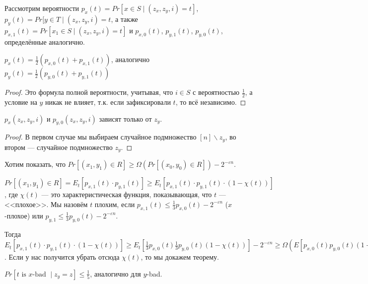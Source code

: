 Рассмотрим вероятности $p_x(t) = Pr[x \in S \mid (z_x, z_y, i) = t]$, $p_y(t) = Pr[y \in T \mid (z_x, z_y, i) = t$, а также $p_{x, 1}(t) = Pr[x_1 \in S \mid (z_x, z_y, i) = t]$ и $p_{x, 0}(t)$, $p_{y, 1}(t)$, $p_{y, 0}(t)$, определённые аналогично.

\begin{remark}
$p_x(t) = \frac{1}{2}(p_{x, 0}(t) + p_{x, 1}(t))$, аналогично $p_y(t) = \frac{1}{2}(p_{y, 0}(t) + p_{y, 1}(t))$
\end{remark}

\begin{proof}
Это формула полной вероятности, учитывая, что $i \in S$ с вероятностью $\frac{1}{2}$, а условие на $y$ никак не влияет, т.к. если зафиксировали $t$, то всё независимо.
\end{proof}

\begin{remark}
$p_x(z_x, z_y, i)$ и $p_{y, 0}(z_x, z_y, i)$ зависят только от $z_y$.
\end{remark}
\begin{proof}
В первом случае мы выбираем случайное подмножество $[n] \backslash z_y$, во втором --- случайное подмножество $z_y$.
\end{proof}

Хотим показать, что $Pr[(x_1, y_1) \in R] \geq \Omega(Pr[(x_0, y_0) \in R]) - 2^{-\varepsilon n}$.

$Pr[(x_1, y_1) \in R] = E_t[p_{x, 1}(t) \cdot p_{y, 1}(t)] \geq E_t[p_{x, 1}(t) \cdot p_{y, 1}(t) \cdot (1 - \chi(t))]$, где $\chi(t)$ --- это характеристическая функция, показывающая, что $t$ --- <<плохое>>. Мы назовём $t$ плохим, если $p_{x, 1}(t) \leq \frac{1}{3}p_{x, 0}(t) - 2^{-\varepsilon n}$ ($x$-плохое) или $p_{y, 1} \leq \frac{1}{3} p_{y, 0}(t) - 2^{-\varepsilon n}$.

Тогда $E_t[p_{x, 1}(t) \cdot p_{y, 1}(t) \cdot (1 - \chi(t))] \geq E_t[\frac{1}{3}p_{x, 0}(t)\frac{1}{3}p_{y, 0}(t)(1 - \chi(t))] - 2^{-\varepsilon n} \geq \Omega(E[p_{x, 0}(t)p_{y, 0}(t)(1 - \chi(t))]) - 2^{-\varepsilon n}$. Если у нас получится убрать отсюда $\chi(t)$, то мы докажем теорему.

\begin{lemma}
$Pr[t \text{ is } x\text{-bad } \mid z_y = z] \leq \frac{1}{5}$, аналогично для $y$-bad.
\end{lemma}

